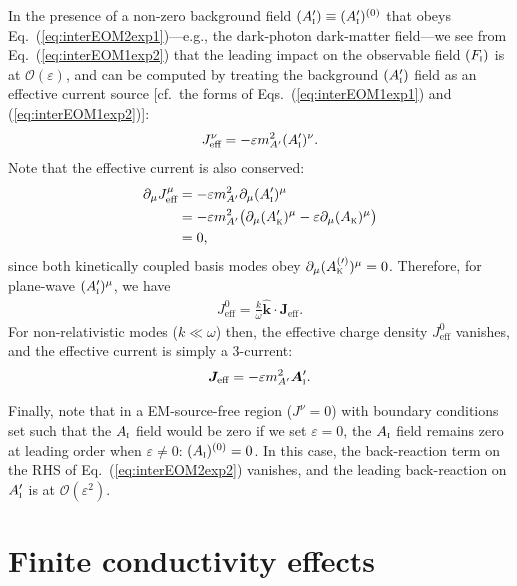 \documentclass[amsmath,amssymb,aps,10pt,prd,letterpaper,nofootinbib,balancelastpage,notitlepage,superscriptaddress,twocolumn,floatfix]{revtex4-2}
\renewcommand{\eqref}[2][]{Eq{#1}.~(\ref{eq:#2})}	%
\newcommand{\tsc}[1]{\textsc{#1}}
\newcommand{\kin}[1]{({#1}_{\textsc{k}})}
\newcommand{\primekin}[1]{({#1}_{\textsc{k}}^\prime)}
\newcommand{\inter}[1]{({#1}_{\textsc{i}})}
\newcommand{\primeinter}[1]{({#1}_{\textsc{i}}^\prime)}
\begin{document}
In the presence of a non-zero background field $\primeinter{A} \equiv \primeinter{A}^{(0)}$ that obeys \eqref{interEOM2exp1}---e.g., the dark-photon dark-matter field---we see from \eqref{interEOM1exp2} that the leading impact on the observable field $\inter{F}$ is at $\mathcal{O}(\varepsilon)$, and can be computed by treating the background $\primeinter{A}$ field as an effective current source [cf.~the forms of \eqref[s]{interEOM1exp1} and (\ref{eq:interEOM1exp2})]: 
\begin{align}
    J_{\text{eff}}^\nu = - \varepsilon m_{A'}^2 \primeinter{A}^\nu.
\end{align}
Note that the effective current is also conserved:
\begin{align}
    \partial_\mu J_{\text{eff}}^\mu &= - \varepsilon m_{A'}^2 \partial_\mu \primeinter{A}^\mu \\
    &= - \varepsilon m_{A'}^2 \big( \partial_\mu \primekin{A}^\mu - \varepsilon \partial_\mu \kin{A}^\mu \big) \\
    &= 0,
\end{align}
since both kinetically coupled basis modes obey $\partial_{\mu} (A_{\tsc{k}}^{(\prime)})^\mu = 0$.
Therefore, for plane-wave $\primeinter{A}^\mu$, we have 
\begin{align}
    J_{\text{eff}}^0 = \frac{k}{\omega} \bm{\hat{k}} \cdot \bm{J}_{\text{eff}}.
\end{align}
For non-relativistic modes ($k \ll \omega$) then, the effective charge density $J_{\text{eff}}^0$ vanishes, and the effective current is simply a 3-current:
\begin{align}
    \bm{J}_{\text{eff}} = - \varepsilon m_{A'}^2 \bm{A}'_{\tsc{i}}.
\end{align}

Finally, note that in a EM-source-free region ($J^\nu=0$) with boundary conditions set such that the $A_{\tsc{i}}$ field would be zero if we set $\varepsilon=0$, the $A_{\tsc{i}}$ field remains zero at leading order when $\varepsilon\neq 0$: $\inter{A}^{(0)} = 0$. 
In this case, the back-reaction term on the RHS of \eqref{interEOM2exp2} vanishes, and the leading back-reaction on $A'_{\tsc{i}}$ is at $\mathcal{O}(\varepsilon^2)$.


\section{Finite conductivity effects}
\label{app:finiteConductivty}
\end{document}
